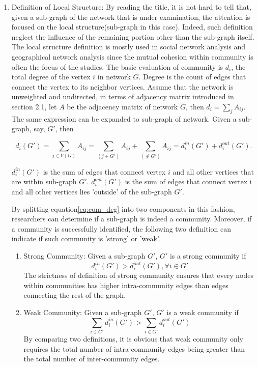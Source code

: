 \documentclass[12pt]{article}
\begin{document}
\begin{enumerate}[label=(\roman*)]
\item Definition of Local Structure: By reading the title, it is not hard to tell that, given a sub-graph of the network that is under examination, the attention is focused on the local structure(sub-graph in this case). Indeed, such definition neglect the influence of the remaining portion other than the sub-graph itself. The local structure definition is mostly used in social network analysis \cite{17} and geographical network analysis \cite{18} since the mutual cohesion within community is often the focus of the studies. The basic evaluation of community is $d_i$, the total degree of the vertex $i$ in network $G$. Degree is the count of edges that connect the vertex to its neighbor vertices. Assume that the network is unweighted and undirected, in terms of adjacency matrix introduced in section 2.1, let $A$ be the adjacency matrix of network $G$, then $d_i = \sum_{j} A_{ij}$. The same expression can be expanded to sub-graph of network. Given a sub-graph, say, $G'$, then 

\begin{equation}\label{eq:com_deg}
d_i(G') = \sum_{j \in V(G)} A_{ij} = \sum_{(j\in G')} A_{ij} + \sum_{(\notin G')} A_{ij} = d_i^{in}(G') + d_i^{out}(G').
\end{equation}

$d_i^{in}(G')$ is the sum of edges that connect vertex $i$ and all other vertices that are within sub-graph $G'$. $d_i^{out}(G')$ is the sum of edges that connect vertex i and all other vertices lies 'outside' of the sub-graph $G'$. 
 
\bigbreak
 
By splitting equation\eqref{eq:com_deg} into two components in this fashion, researchers can determine if a sub-graph is indeed a community. Moreover, if a community is successfully identified, the following two definition can indicate if such community is 'strong' or 'weak'.

\begin{enumerate}
    \item Strong Community: Given a sub-graph $G'$, $G'$ is a strong community if
    \begin{equation}\label{eq:strong_com}
    d_i^{in}(G') > d_i^{out}(G'), \forall i \in G'
    \end{equation}
    The strictness of definition of strong community ensures that every nodes within communities has higher intra-community edges than edges connecting the rest of the graph.
    \item Weak Community: Given a sub-graph $G'$, $G'$ is a weak community if
    \begin{equation}\label{eq:weak_com}
    \sum_{i \in G'}d_i^{in}(G') > \sum_{i \in G'}d_i^{out}(G')
    \end{equation}
    By comparing two definitions, it is obvious that weak community only requires the total number of intra-community edges being greater than the total number of inter-community edges.
\end{enumerate}


\end{enumerate}
\end{document}
